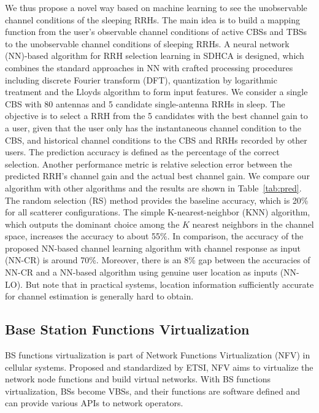 \documentclass[12pt, draftclsnofoot,onecolumn]{IEEEtran}
\begin{document}
We thus propose a novel way based on machine learning to see the unobservable
channel conditions of the sleeping RRHs. The main idea is to build a mapping
function from the user's observable channel conditions of active CBSs and TBSs
to the unobservable channel conditions of sleeping RRHs.
A neural network (NN)-based algorithm for RRH selection
learning in SDHCA is designed, which combines the standard
approaches in NN with crafted processing procedures including discrete Fourier
transform (DFT), quantization by
logarithmic treatment and the Lloyds algorithm to form input features. We consider a single CBS with 80
antennas and 5 candidate single-antenna RRHs in sleep. The objective is to
select a RRH from the 5 candidates with the best channel gain to a user, given that the
user only has the instantaneous channel condition to the CBS, and historical
channel conditions to the CBS and RRHs recorded by other users. The prediction
accuracy is defined as the percentage of the correct selection. Another
performance metric is relative selection error between the predicted RRH's
channel gain and the actual best channel gain. We compare our algorithm with
other algorithms and the results are shown in Table~\ref{tab:pred}. The random selection (RS)
method provides the baseline accuracy, which is 20\% for all scatterer
configurations. The simple K-nearest-neighbor (KNN) algorithm, which outputs
the dominant choice among the $K$ nearest neighbors in the channel space,
increases the accuracy to about 55\%. In comparison, the accuracy of the
proposed NN-based channel learning algorithm with channel response as input (NN-CR) is around 70\%. Moreover, there is an 8\% gap
between the accuracies of NN-CR and a NN-based algorithm using
genuine user location as inputs (NN-LO). But note that in practical systems,
location information sufficiently accurate for channel estimation is generally hard to
obtain.

\subsection{Base Station Functions Virtualization}

BS functions virtualization is part of Network Functions
Virtualization (NFV) in cellular systems. Proposed and standardized by ETSI,
NFV aims to virtualize the network node
functions and build virtual networks. With BS functions virtualization, BSs
become VBSs, and their functions are software defined and can provide various APIs to
network operators.
\end{document}
